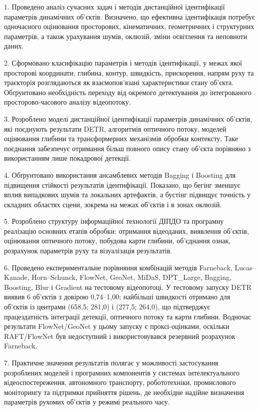 \documentclass[
]{article}
\begin{document}
1. Проведено аналіз сучасних задач і методів дистанційної ідентифікації параметрів динамічних об'єктів. Визначено, що ефективна ідентифікація потребує одночасного оцінювання просторових, кінематичних, геометричних і структурних параметрів, а також урахування шумів, оклюзій, зміни освітлення та неповноти даних.

2. Сформовано класифікацію параметрів і методів ідентифікації, у межах якої просторові координати, глибина, контур, швидкість, прискорення, напрям руху та траєкторія розглядаються як взаємопов'язані характеристики стану об'єкта. Обґрунтовано необхідність переходу від окремого детектування до інтегрованого просторово-часового аналізу відеопотоку.

3. Розроблено моделі дистанційної ідентифікації параметрів динамічних об'єктів, які поєднують результати DETR, алгоритмів оптичного потоку, моделей оцінювання глибини та трансформерних механізмів обробки контексту. Таке поєднання забезпечує отримання більш повного опису стану об'єкта порівняно з використанням лише покадрової детекції.

4. Обґрунтовано використання ансамблевих методів Bagging і Boosting для підвищення стійкості результатів ідентифікації. Показано, що бегінг зменшує вплив випадкових шумів та локальних артефактів, а бустінг підвищує точність у складних областях сцени, зокрема на межах об'єктів і в зонах оклюзій.

5. Розроблено структуру інформаційної технології ДІПДО та програмну реалізацію основних етапів обробки: отримання відеоданих, виявлення об'єктів, оцінювання оптичного потоку, побудова карти глибини, об'єднання ознак, розрахунок параметрів руху та візуалізація результатів.

6. Проведено експериментальне порівняння комбінацій методів Farneback, Lucas--Kanade, Horn--Schunck, FlowNet, GeoNet, MiDaS, DPT\_Large, Bagging, Boosting, Blur і Gradient на тестовому відеопотоці. У тестовому запуску DETR виявив 6 об'єктів з довірою 0,74--1,00; найбільші швидкості отримано для об'єктів із центрами (658,5; 281,0) і (277,5; 264,0), що підтверджує працездатність інтеграції детекції, оптичного потоку та карти глибини. Водночас результати FlowNet/GeoNet у цьому запуску є проксі-оцінками, оскільки RAFT/FlowNet був недоступний і використовувався резервний розрахунок Farneback.

7. Практичне значення результатів полягає у можливості застосування розроблених моделей і програмних компонентів у системах інтелектуального відеоспостереження, автономного транспорту, робототехніки, промислового моніторингу та підтримки прийняття рішень, де необхідне надійне визначення параметрів рухомих об'єктів у режимі реального часу.
\end{document}
